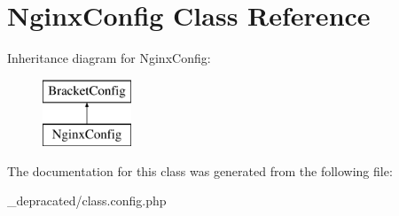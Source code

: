 \hypertarget{class_nginx_config}{
\section{\-Nginx\-Config \-Class \-Reference}
\label{class_nginx_config}
}
\-Inheritance diagram for \-Nginx\-Config\-:\begin{figure}[H]
\begin{center}
\leavevmode
\includegraphics[height=2.000000cm]{class_nginx_config}
\end{center}
\end{figure}


\-The documentation for this class was generated from the following file\-:\begin{DoxyCompactItemize}
\item 
\-\_\-depracated/class.\-config.\-php\end{DoxyCompactItemize}
